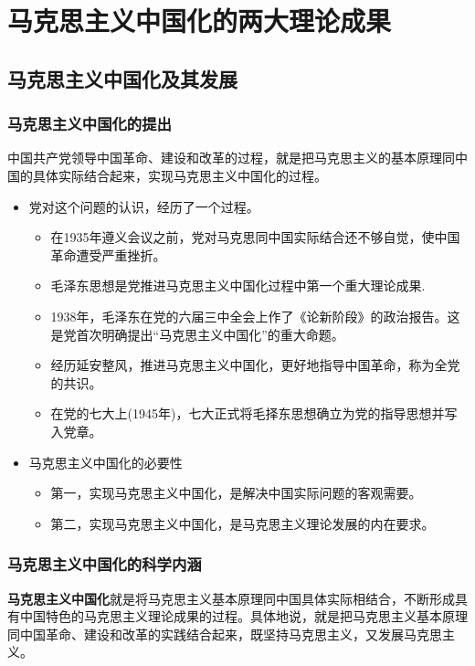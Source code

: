 \chapter{马克思主义中国化的两大理论成果}
\section{马克思主义中国化及其发展}
\subsection{马克思主义中国化的提出}

中国共产党领导中国革命、建设和改革的过程，就是把马克思主义的基本原理同中国的具体实际结合起来，实现马克思主义中国化的过程。
\begin{itemize}
	\item 党对这个问题的认识，经历了一个过程。
	\begin{itemize}
		\item 在1935年遵义会议之前，党对马克思同中国实际结合还不够自觉，使中国革命遭受严重挫折。
		\item 	毛泽东思想是党推进马克思主义中国化过程中第一个重大理论成果.
		\item 1938年，毛泽东在党的六届三中全会上作了《论新阶段》的政治报告。这是党首次明确提出“马克思主义中国化”的重大命题。
		\item 经历延安整风，推进马克思主义中国化，更好地指导中国革命，称为全党的共识。
		\item 在党的七大上(1945年)，七大正式将毛择东思想确立为党的指导思想并写入党章。
		
	\end{itemize}
	\item 马克思主义中国化的必要性
	\begin{itemize}
		\item 第一，实现马克思主义中国化，是解决中国实际问题的客观需要。
		\item 第二，实现马克思主义中国化，是马克思主义理论发展的内在要求。
	\end{itemize}
	
\end{itemize}
\subsection{马克思主义中国化的科学内涵}
\textbf{马克思主义中国化}就是将马克思主义基本原理同中国具体实际相结合，不断形成具有中国特色的马克思主义理论成果的过程。具体地说，就是把马克思主义基本原理同中国革命、建设和改革的实践结合起来，既坚持马克思主义，又发展马克思主义。
